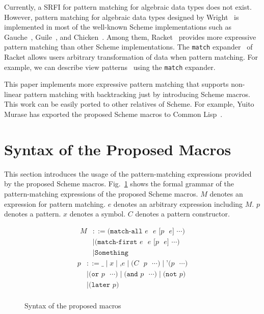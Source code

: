 \documentclass[acmlarge]{acmart}
\newcommand{\todo}[1]{\textcolor{red}{(TODO: #1)}}
\newcommand{\new}[1]{\textcolor{blue}{#1}}
\begin{document}

Currently, a SRFI for pattern matching for algebraic data types does not exist.
However, pattern matching for algebraic data types designed by Wright~\cite{wright1993pattern} is implemented in most of the well-known Scheme implementations such as Gauche~\cite{gauchePM}, Guile~\cite{guilePM}, and Chicken~\cite{chickenPM}.
Among them, Racket~\cite{plt-tr1} provides more expressive pattern matching than other Scheme implementations.
The \lstinline{match} expander~\cite{tobin2011extensible} of Racket allows users arbitrary transformation of data when pattern matching.
For example, we can describe view patterns~\cite{wadler1987views} using the \lstinline{match} expander.

This paper implements more expressive pattern matching that supports non-linear pattern matching with backtracking just by introducing Scheme macros.
This work can be easily ported to other relatives of Scheme.
For example, Yuito Murase has exported the proposed Scheme macros to Common Lisp~\cite{egisonLisp}.


\section{Syntax of the Proposed Macros}\label{usage}

This section introduces the usage of the pattern-matching expressions provided by the proposed Scheme macros.
Fig.~\ref{fig:syntax} shows the formal grammar of the pattern-matching expressions of the proposed Scheme macros.
$M$ denotes an expression for pattern matching.
$e$ denotes an arbitrary expression including $M$.
$p$ denotes a pattern.
$x$ denotes a symbol.
$C$ denotes a pattern constructor.

\begin{figure}[h]
  \vspace{-3mm}
\begin{multicols}{2}
\noindent
\begin{align*}
M &::= \texttt{(match-all $e$ $e$ [$p$ $e$] $\cdots$)} \\
&\mid \texttt{(match-first $e$ $e$ [$p$ $e$] $\cdots$)} \\
&\mid \texttt{Something}
\end{align*}
\columnbreak
\begin{align*}
p &::= \texttt{_} \mid \texttt{$x$} \mid \texttt{,$e$} \mid \texttt{($C$ $p$ $\cdots$)} \mid \texttt{'($p$ $\cdots$)} \\
&\mid \texttt{(or $p$ $\cdots$)} \mid \texttt{(and $p$ $\cdots$)} \mid \texttt{(not $p$)} \\
&\mid \texttt{(later $p$)} \\
\end{align*}
\end{multicols}
  \vspace{-8mm}
  \caption{Syntax of the proposed macros}
  \label{fig:syntax}
\end{figure}
\end{document}
